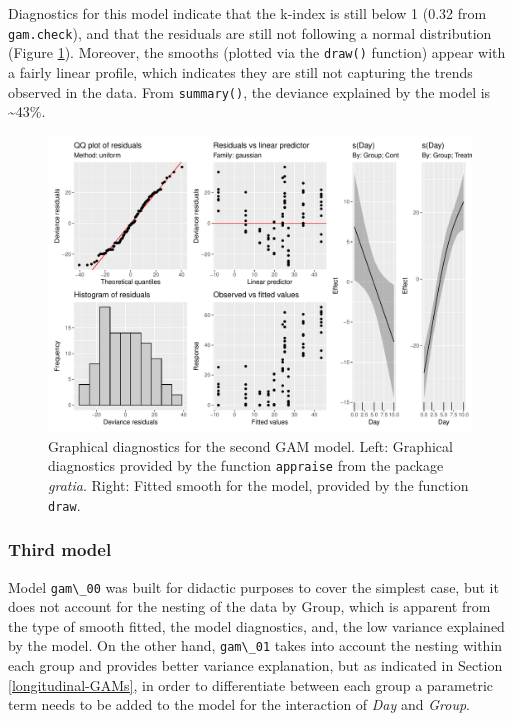 \documentclass[
]{article}
\newcommand{\passthrough}[1]{#1}
\begin{document}
Diagnostics for this model indicate that the k-index is still below 1 (0.32 from \passthrough{\lstinline!gam.check!}), and that the residuals are still not following a normal distribution (Figure \ref{fig:second-GAM-diag}). Moreover, the smooths (plotted via the \passthrough{\lstinline!draw()!} function) appear with a fairly linear profile, which indicates they are still not capturing the trends observed in the data. From \passthrough{\lstinline!summary()!}, the deviance explained by the model is \textasciitilde{}43\%.



\begin{figure}[H]

{\centering \includegraphics[width=0.75\linewidth,]{Full_document_files/figure-latex/second-GAM-diag-1} 

}

\caption{Graphical diagnostics for the second GAM model. Left: Graphical diagnostics provided by the function \passthrough{\lstinline!appraise!} from the package \emph{gratia}. Right: Fitted smooth for the model, provided by the function \passthrough{\lstinline!draw!}.}\label{fig:second-GAM-diag}
\end{figure}

\hypertarget{third-model}{%
\subsubsection{Third model}\label{third-model}}

Model \passthrough{\lstinline!gam\_00!} was built for didactic purposes to cover the simplest case, but it does not account for the nesting of the data by Group, which is apparent from the type of smooth fitted, the model diagnostics, and, the low variance explained by the model. On the other hand, \passthrough{\lstinline!gam\_01!} takes into account the nesting within each group and provides better variance explanation, but as indicated in Section \ref{longitudinal-GAMs}, in order to differentiate between each group a parametric term needs to be added to the model for the interaction of \emph{Day} and \emph{Group}.
\end{document}
